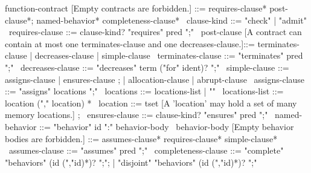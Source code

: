 \begin{syntax}
  function-contract [Empty contracts are forbidden.] ::= requires-clause* post-clause*;
                        named-behavior* completeness-clause*
  \
  clause-kind ::= "check" | "admit"
  \
  requires-clause ::= clause-kind? "requires" pred ";"
  \
  post-clause [A contract can contain at most one terminates-clause and one decreases-clause.]::=
                terminates-clause | decreases-clause | simple-clause
  \
  terminates-clause ::= "terminates" pred ";"
  \
  decreases-clause ::= "decreases" term ("for" ident)? ";"
  \
  simple-clause ::= assigns-clause | ensures-clause ;
                | allocation-clause | abrupt-clause
  \
  assigns-clause ::= "assigns" locations ";"
  \
  locations ::= locations-list | "\nothing"
  \
  locations-list ::= location ("," location) *
  \
  location ::= tset [A 'location' may hold a set of many memory locations.] ;
  \
  ensures-clause ::= clause-kind? "ensures" pred ";"
  \
  named-behavior ::= "behavior" id ":" behavior-body
  \
  behavior-body [Empty behavior bodies are forbidden.] ::= assumes-clause* requires-clause* simple-clause*
  \
  assumes-clause ::= "assumes" pred ";"
  \
  completeness-clause ::= "complete" "behaviors" (id (","id)*)? ";";
     | "disjoint" "behaviors" (id (","id)*)? ";"
\end{syntax}

